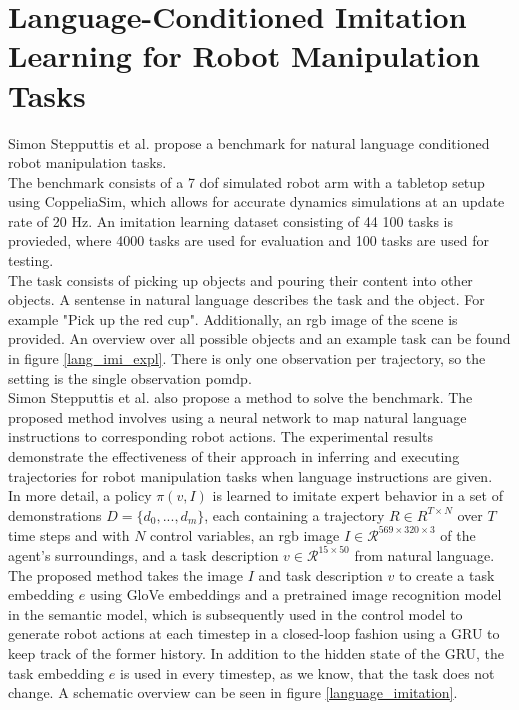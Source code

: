 \chapter{Language-Conditioned Imitation Learning for Robot Manipulation Tasks}
\label{LCILRM}
Simon Stepputtis et al. \cite{stepputtis2020languageconditioned} propose a benchmark for natural language conditioned robot manipulation tasks. \\
The benchmark consists of a 7 dof simulated robot arm with a 
tabletop setup using CoppeliaSim, which allows for accurate dynamics simulations at an update rate of 20 Hz. 
An imitation learning dataset consisting of 44 100 tasks is provieded, where 4000 tasks are used for 
evaluation and 100 tasks are used for testing.\\

The task consists of picking up objects and pouring their content into other objects. A sentense in natural language describes the task and the object. 
For example "Pick up the red cup". Additionally, an rgb image of the scene is provided. An overview over 
all possible objects and an example task can be found in figure \ref{lang_imi_expl}. 
There is only one observation per trajectory, so the setting is the single observation \ac{pomdp}.  \\


Simon Stepputtis et al. \cite{stepputtis2020languageconditioned} also propose a method to solve the benchmark. 
The proposed method involves using a neural network to map natural language instructions to 
corresponding robot actions. The experimental results demonstrate the effectiveness of their approach in inferring and executing trajectories for robot manipulation 
tasks when language instructions are given. \\

In more detail, a policy $\pi(v,I)$ is learned to imitate expert behavior in a set of demonstrations $D = \{d_0,...,d_m\}$, each containing a trajectory 
$R \in R^{T \times N}$ over $T$ time steps and with $N$ control variables, an rgb image $I \in \mathcal{R}^{569 \times 320 \times 3}$ of the agent's surroundings, 
and a task description $v \in \mathcal{R}^{15 \times 50}$ from natural language. The proposed method takes the image $I$ and task description $v$ 
to create a task embedding $e$ using GloVe embeddings and a pretrained image recognition model in the semantic model, 
which is subsequently used in the control model to generate robot actions at each timestep in a closed-loop 
fashion using a GRU to keep track of the former history. In addition to the hidden state of the GRU, 
the task embedding $e$ is used in every timestep, as we know, that the task does not change. A schematic overview can be seen in figure \ref{language_imitation}. \\

